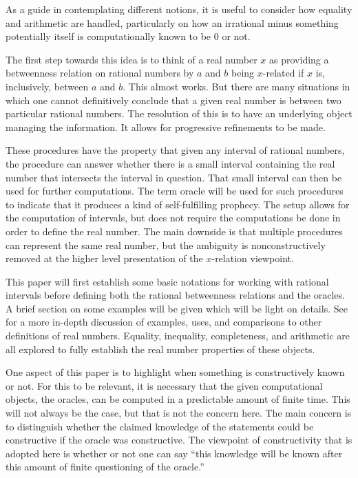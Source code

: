 \documentclass[12pt]{article}
\begin{document}
As a guide in contemplating different notions, it is useful to consider how equality and arithmetic are handled, particularly on how an irrational minus something potentially itself is computationally known to be 0 or not. 

The first step towards this idea is to think of a real number $x$ as providing a betweenness relation on rational numbers by $a$ and $b$ being $x$-related if $x$ is, inclusively, between $a$ and $b$. This almost works. But there are many situations in which one cannot definitively conclude that a given real number is between two particular rational numbers. The resolution of this is to have an underlying object managing the information. It allows for progressive refinements to be made. 

These procedures have the property that given any interval of rational numbers, the procedure can answer whether there is a small interval containing the real number that intersects the interval in question. That small interval can then be used for further computations. The term oracle will be used for such procedures to indicate that it produces a kind of self-fulfilling prophecy. The setup allows for the computation of intervals, but does not require the computations be done in order to define the real number. The main downside is that multiple procedures can represent the same real number, but the ambiguity is nonconstructively removed at the higher level presentation of the $x$-relation viewpoint.  

This paper will first establish some basic notations for working with rational intervals before defining both the rational betweenness relations and the oracles. A brief section on some examples will be given which will be light on details. See \cite{taylor23main} for a more in-depth discussion of examples, uses, and comparisons to other definitions of real numbers. Equality, inequality, completeness, and arithmetic are all explored to fully establish the real number properties of these objects. 

One aspect of this paper is to highlight when something is constructively known or not. For this to be relevant, it is necessary that the given computational objects, the oracles, can be computed in a predictable amount of finite time. This will not always be the case, but that is not the concern here. The main concern is to distinguish whether the claimed knowledge of the statements could be constructive if the oracle was constructive. The viewpoint of constructivity that is adopted here is whether or not one can say ``this knowledge will be known after this amount of finite questioning of the oracle.'' 
\end{document}
